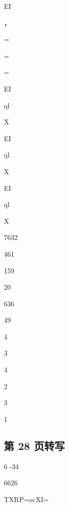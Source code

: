 EI

，


=

=

=

EI

ql

X

EI

ql

X

EI

ql

X

7632

461

159

20

636

49

4

3

4

2

3

1

\subsection*{第 28 页转写}
6 -34

6626

TXRP=ocXI=


